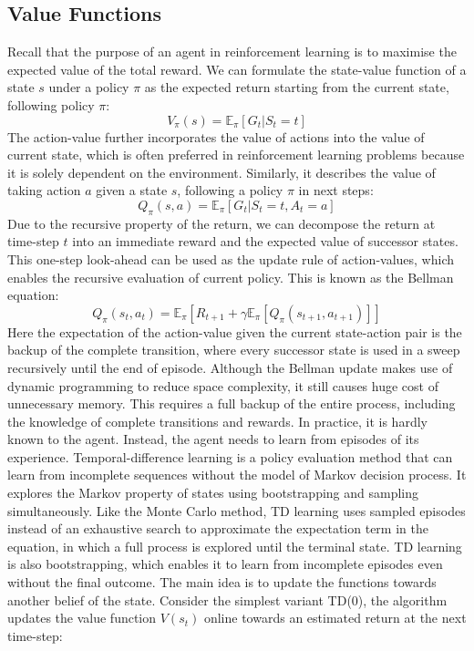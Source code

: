 \documentclass[oneside,11pt,a4paper]{article}
\begin{document}
\subsection{Value Functions}
Recall that the purpose of an agent in reinforcement learning is to maximise the expected value of the total reward. We can formulate the state-value function of a state $s$ under a policy $\pi$ as the expected return starting from the current state, following policy $\pi$:
$$
V_\pi(s) = \mathbb E_\pi[G_t|S_t=t]
$$
The action-value further incorporates the value of actions into the value of current state, which is often preferred in reinforcement learning problems because it is solely dependent on the environment. Similarly, it describes the value of taking action $a$ given a state $s$, following a policy $\pi$ in next steps:
$$
Q_\pi(s,a) = \mathbb E_\pi[G_t|S_t = t, A_t = a]
$$
Due to the recursive property of the return, we can decompose the return at time-step $t$ into an immediate reward and the expected value of successor states. This one-step look-ahead can be used as the update rule of action-values, which enables the recursive evaluation of current policy. This is known as the Bellman equation:
$$
Q_\pi(s_t,a_t) = \mathbb E_\pi[R_{t+1} + \gamma\mathbb E_\pi [Q_\pi(s_{t+1}, a_{t+1})]]
$$
Here the expectation of the action-value given the current state-action pair is the backup of the complete transition, where every successor state is used in a sweep recursively until the end of episode. Although the Bellman update makes use of dynamic programming to reduce space complexity, it still causes huge cost of unnecessary memory. This requires a full backup of the entire process, including the knowledge of complete transitions and rewards. In practice, it is hardly known to the agent. Instead, the agent needs to learn from episodes of its experience.
\vspace{0.25cm}
\noindent
Temporal-difference learning is a policy evaluation method that can learn from incomplete sequences without the model of Markov decision process. \cite{td} It explores the Markov property of states using bootstrapping and sampling simultaneously. Like the Monte Carlo method, TD learning uses sampled episodes instead of an exhaustive search to approximate the expectation term in the equation, in which a full process is explored until the terminal state. TD learning is also bootstrapping, which enables it to learn from incomplete episodes even without the final outcome. The main idea is to update the functions towards another belief of the state. Consider the simplest variant TD(0), the algorithm updates the value function $V(s_t)$ online towards an estimated return at the next time-step:
\end{document}
